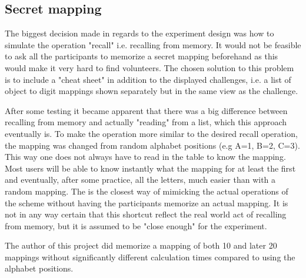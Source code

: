\subsection{Secret mapping} The biggest decision made in regards to the experiment design was how to simulate the operation "recall" i.e. recalling from memory. It would not be feasible to ask all the participants to memorize a secret mapping beforehand as this would make it very hard to find volunteers. The chosen solution to this problem is to include a "cheat sheet" in addition to the displayed challenges, i.e. a list of object to digit mappings shown separately but in the same view as the challenge.
\par After some testing it became apparent that there was a big difference between recalling from memory and actually "reading" from a list, which this approach eventually is. To make the operation more similar to the desired recall operation, the mapping was changed from random alphabet positions (e.g A=1, B=2, C=3). This way one does not always have to read in the table to know the mapping. Most users will be able to know instantly what the mapping for at least the first and eventually, after some practice, all the letters, much easier than with a random mapping. The is the closest way of mimicking the actual operations of the scheme without having the participants memorize an actual mapping. It is not in any way certain that this shortcut reflect the real world act of recalling from memory, but it is assumed to be "close enough" for the experiment. 
\begin{remark}
The author of this project did memorize a mapping of both 10 and later 20 mappings without significantly different calculation times compared to using the alphabet positions.
\end{remark}

